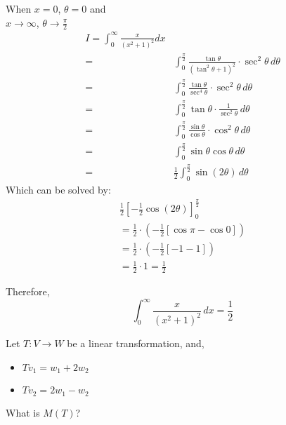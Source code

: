 \documentclass{my-cls}
\begin{document}
\begin{solution}
    When \(x = 0\), \(\theta = 0\) and \\\(x \to \infty\), \(\theta \to \frac{\pi}{2}\)
    \[
    \begin{split}
        I = \int_0^\infty \frac{x}{(x^2+1)^2}dx \\
        = &\int_0^\frac{\pi}{2} \frac{\tan\theta}{(\tan^2\theta+1)^2}\cdot \sec^2\theta \,d\theta \\
        = & \int_0^\frac{\pi}{2} \frac{\tan \theta}{\sec^4 \theta} \cdot \sec^2 \theta \, d\theta \\
        = & \int_0^\frac{\pi}{2} \tan \theta \cdot \frac{1}{\sec^2 \theta} \, d\theta \\
        = & \int_0^\frac{\pi}{2} \frac{\sin \theta}{\cos \theta} \cdot \cos^2 \theta \, d\theta \\
        = & \int_0^\frac{\pi}{2} \sin \theta \cos \theta \, d\theta \\
        = & \frac{1}{2} \int_0^\frac{\pi}{2} \sin(2\theta) \, d\theta
    \end{split}
    \]
    Which can be solved by:
    \[
    \begin{split}
        \frac{1}{2} \left[ -\frac{1}{2} \cos(2\theta) \right]_0^\frac{\pi}{2} \\
        = \frac{1}{2} \cdot \left( -\frac{1}{2} [\cos \pi - \cos 0] \right)\\
        = \frac{1}{2} \cdot \left( -\frac{1}{2} [-1 - 1] \right)\\
        = \frac{1}{2} \cdot 1 = \frac{1}{2}
    \end{split}
    \]

    Therefore,
    \[
    \boxed{\int_0^\infty \frac{x}{(x^2 + 1)^2} \, dx = \frac{1}{2}}
    \]

\end{solution}

\begin{problem}[4]
    Let \(T: V\rightarrow W\) be a linear transformation, and,
    \begin{itemize}
        \item \(Tv_1 = w_1 + 2w_2\)
        \item \(Tv_2 = 2w_1 - w_2\)
    \end{itemize}
    What is \(M(T)\)?
    
    \bigskip
    
\end{problem}
\end{document}
